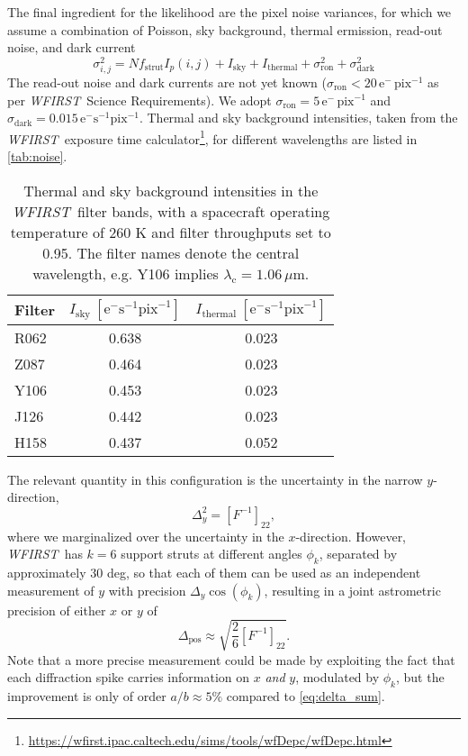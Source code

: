 \documentclass[modern, times]{aastex61}
\newcommand\wfirst{\textit{WFIRST}}
\begin{document}
The final ingredient for the likelihood are the pixel noise variances, for which we assume a combination of Poisson, sky background, thermal ermission, read-out noise, and dark current
\begin{equation}
\label{eq:noise}
\sigma_{i,j}^2 = N f_\mathrm{strut} I_p(i,j) + I_\mathrm{sky} + I_\mathrm{thermal} + \sigma^2_\mathrm{ron} + \sigma^2_\mathrm{dark}
\end{equation}
The read-out noise and dark currents are not yet known ($\sigma_\mathrm{ron}<20\, \mathrm{e}^-\,\mathrm{pix}^{-1}$ as per \wfirst\ Science Requirements). We adopt $\sigma_\mathrm{ron}= 5\,\mathrm{e}^-\,\mathrm{pix}^{-1}$ and $\sigma_\mathrm{dark} = 0.015\, \mathrm{e}^- \mathrm{s}^{-1} \mathrm{pix}^{-1}$.
Thermal and sky background intensities, taken from the \wfirst\ exposure time calculator\footnote{\url{https://wfirst.ipac.caltech.edu/sims/tools/wfDepc/wfDepc.html}}, for different wavelengths are listed in \autoref{tab:noise}.

\begin{table}
\caption{Thermal and sky background intensities in the \wfirst\ filter bands, with a spacecraft operating temperature of 260 K and filter throughputs set to 0.95. The filter names denote the central wavelength, e.g. Y106 implies $\lambda_\mathrm{c}=1.06\,\mu$m.}
\label{tab:noise}
\begin{tabular}{lcc}
\hline\hline
Filter & $I_\mathrm{sky}\ [\mathrm{e}^- \mathrm{s}^{-1} \mathrm{pix}^{-1}]$ & $I_\mathrm{thermal}\ [\mathrm{e}^- \mathrm{s}^{-1} \mathrm{pix}^{-1}]$\\
\hline
R062 & 0.638 & 0.023\\
Z087 & 0.464 & 0.023\\
Y106 & 0.453 & 0.023\\
J126 & 0.442 & 0.023\\
H158 & 0.437 & 0.052\\
\hline
\end{tabular}
\end{table}

The relevant quantity in this configuration is the uncertainty in the narrow $y$-direction,
\begin{equation}
\Delta_y^2 = \left[F^{-1}\right]_{22},
\end{equation}
where we marginalized over the uncertainty in the $x$-direction.
However, \wfirst\ has $k=6$ support struts at different angles $\phi_k$, separated by approximately 30 deg, so that each of them can be used as an independent measurement of $y$ with precision $\Delta_y\cos(\phi_k)$, resulting in a joint astrometric precision of either $x$ or $y$ of
\begin{equation}
\label{eq:delta_sum} 
\Delta_\mathrm{pos} \approx \sqrt{\frac{2}{6} \left[F^{-1}\right]_{22}}.
\end{equation}
Note that a more precise measurement could be made by exploiting the fact that each diffraction spike carries information on $x$ \emph{and} $y$, modulated by $\phi_k$, but the improvement is only of order $a\big/b\approx5\%$ compared to \autoref{eq:delta_sum}.
\end{document}
